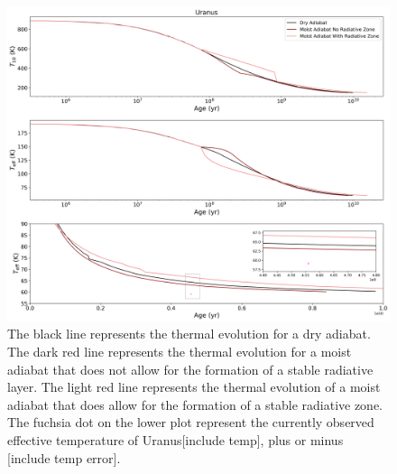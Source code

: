 \documentclass[11pt]{ucscthesisbs}
\begin{document}
\begin{figure}[ht]
 \centerline{
  \includegraphics[scale=0.5]{figures/dry_moist_radiative_u_cooling_curves_adiabat_comparisons.png}
 }
\caption[Thermal Evolution Curves for Uranus - Adiabat Comparisons]
{The black line represents the thermal evolution for a dry adiabat. The dark red line represents the thermal evolution for a moist adiabat that does not allow for the formation of a stable radiative layer. The light red line represents the thermal evolution of a moist adiabat that does allow for the formation of a stable radiative zone. The fuchsia dot on the lower plot represent the currently observed effective temperature of Uranus[include temp], plus or minus [include temp error]. }
\label{fig:evolve_adiabats}
\end{figure}
\end{document}
